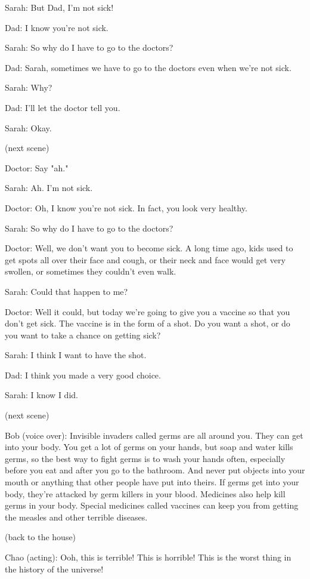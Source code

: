 Sarah: But Dad, I'm not sick!

Dad: I know you're not sick.

Sarah: So why do I have to go to the doctors?

Dad: Sarah, sometimes we have to go to the doctors even when we're not sick.

Sarah: Why?

Dad: I'll let the doctor tell you.

Sarah: Okay.

(next scene)

Doctor: Say "ah."

Sarah: Ah. I'm not sick.

Doctor: Oh, I know you're not sick. In fact, you look very healthy.

Sarah: So why do I have to go to the doctors?

Doctor: Well, we don't want you to become sick. A long time ago, kids used to get spots all over their face and cough, or their neck and face would get very swollen, or sometimes they couldn't even walk.

Sarah: Could that happen to me?

Doctor: Well it could, but today we're going to give you a vaccine so that you don't get sick. The vaccine is in the form of a shot. Do you want a shot, or do you want to take a chance on getting sick?

Sarah: I think I want to have the shot.

Dad: I think you made a very good choice.

Sarah: I know I did.

(next scene)

Bob (voice over): Invisible invaders called germs are all around you. They can get into your body. You get a lot of germs on your hands, but soap and water kills germs, so the best way to fight germs is to wash your hands often, especially before you eat and after you go to the bathroom. And never put objects into your mouth or anything that other people have put into theirs. If germs get into your body, they're attacked by germ killers in your blood. Medicines also help kill germs in your body. Special medicines called vaccines can keep you from getting the measles and other terrible diseases.

(back to the house)

Chao (acting): Ooh, this is terrible! This is horrible! This is the worst thing in the history of the universe!

